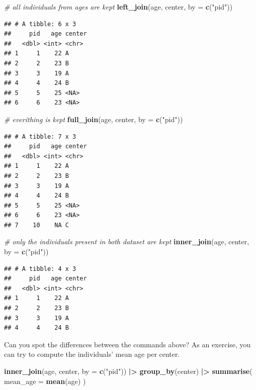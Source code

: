 \documentclass[
]{book}
\newenvironment{Shaded}{\begin{snugshade}}{\end{snugshade}}
\newcommand{\AttributeTok}[1]{\textcolor[rgb]{0.13,0.29,0.53}{#1}}
\newcommand{\CommentTok}[1]{\textcolor[rgb]{0.56,0.35,0.01}{\textit{#1}}}
\newcommand{\FunctionTok}[1]{\textcolor[rgb]{0.13,0.29,0.53}{\textbf{#1}}}
\newcommand{\NormalTok}[1]{#1}
\newcommand{\SpecialCharTok}[1]{\textcolor[rgb]{0.81,0.36,0.00}{\textbf{#1}}}
\newcommand{\StringTok}[1]{\textcolor[rgb]{0.31,0.60,0.02}{#1}}
\begin{document}
\begin{Shaded}
\begin{Highlighting}[]
\CommentTok{\# all individuals from ages are kept}
\FunctionTok{left\_join}\NormalTok{(age, center, }\AttributeTok{by =} \FunctionTok{c}\NormalTok{(}\StringTok{"pid"}\NormalTok{))}
\end{Highlighting}
\end{Shaded}

\begin{verbatim}
## # A tibble: 6 x 3
##     pid   age center
##   <dbl> <int> <chr> 
## 1     1    22 A     
## 2     2    23 B     
## 3     3    19 A     
## 4     4    24 B     
## 5     5    25 <NA>  
## 6     6    23 <NA>
\end{verbatim}

\begin{Shaded}
\begin{Highlighting}[]
\CommentTok{\# everithing is kept}
\FunctionTok{full\_join}\NormalTok{(age, center, }\AttributeTok{by =} \FunctionTok{c}\NormalTok{(}\StringTok{"pid"}\NormalTok{))}
\end{Highlighting}
\end{Shaded}

\begin{verbatim}
## # A tibble: 7 x 3
##     pid   age center
##   <dbl> <int> <chr> 
## 1     1    22 A     
## 2     2    23 B     
## 3     3    19 A     
## 4     4    24 B     
## 5     5    25 <NA>  
## 6     6    23 <NA>  
## 7    10    NA C
\end{verbatim}

\begin{Shaded}
\begin{Highlighting}[]
\CommentTok{\# only the individuals present in both dataset are kept}
\FunctionTok{inner\_join}\NormalTok{(age, center, }\AttributeTok{by =} \FunctionTok{c}\NormalTok{(}\StringTok{"pid"}\NormalTok{))}
\end{Highlighting}
\end{Shaded}

\begin{verbatim}
## # A tibble: 4 x 3
##     pid   age center
##   <dbl> <int> <chr> 
## 1     1    22 A     
## 2     2    23 B     
## 3     3    19 A     
## 4     4    24 B
\end{verbatim}

Can you spot the differences between the commands above?
As an exercise, you can try to compute the individuals' mean age per center.

\begin{Shaded}
\begin{Highlighting}[]
\FunctionTok{inner\_join}\NormalTok{(age, center, }\AttributeTok{by =} \FunctionTok{c}\NormalTok{(}\StringTok{"pid"}\NormalTok{)) }\SpecialCharTok{|\textgreater{}}
  \FunctionTok{group\_by}\NormalTok{(center) }\SpecialCharTok{|\textgreater{}}
  \FunctionTok{summarise}\NormalTok{(}
    \AttributeTok{mean\_age =} \FunctionTok{mean}\NormalTok{(age)}
\NormalTok{  )}
\end{Highlighting}
\end{Shaded}
\end{document}

